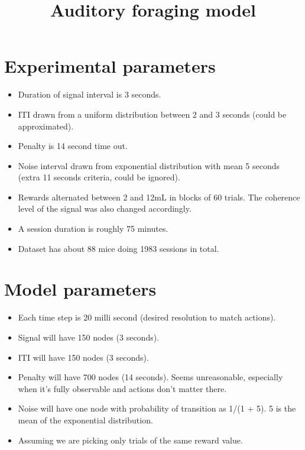 \documentclass[11pt, oneside]{article}
\title{Auditory foraging model}
\author{}
\date{}
\begin{document}
\maketitle
\section{Experimental parameters}
\begin{itemize}
\item Duration  of signal interval is 3 seconds.
\item ITI drawn from a uniform distribution between 2 and 3 seconds (could be approximated).
\item Penalty is 14 second time out.
\item Noise interval drawn from exponential distribution with mean 5 seconds (extra 11 seconds criteria, could be ignored).
\item Rewards alternated between 2 and 12mL in blocks of 60 trials. The coherence level of the signal was also changed accordingly.
\item A session duration is roughly 75 minutes.
\item Dataset has about 88 mice doing 1983 sessions in total.
\end{itemize}  
\section{Model parameters}
\begin{itemize}  
\item Each time step is 20 milli second (desired resolution to match actions).
\item Signal will have 150 nodes (3 seconds).
\item ITI will have 150 nodes (3 seconds).
\item Penalty will have 700 nodes (14 seconds). Seems unreasonable, especially when it's fully observable and actions don't matter there.
\item Noise will have one node with probability of transition as 1/(1 + 5). 5 is the mean of the exponential distribution.
\item Assuming we are picking only trials of the same reward value.
\end{itemize}
\end{document}
